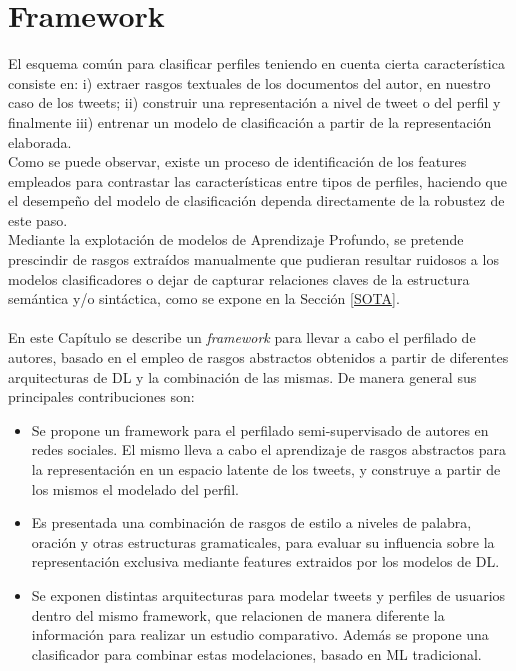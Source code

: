 
\chapter{Framework}

	El esquema común para clasificar perfiles teniendo en cuenta cierta característica consiste en: i) extraer rasgos textuales de los documentos del autor, en nuestro caso de los tweets; ii) construir una representación a nivel de tweet o del perfil y finalmente iii) entrenar un modelo de clasificación a partir de la representación elaborada. 
	\\
	Como se puede observar, existe un proceso de identificación de los features empleados para contrastar las características entre tipos de perfiles, haciendo que el desempeño del modelo de clasificación dependa directamente de la robustez de este paso. 
	\\
	Mediante la explotación de modelos de Aprendizaje Profundo, se pretende prescindir de rasgos extraídos manualmente que pudieran resultar ruidosos a los modelos clasificadores o dejar de capturar relaciones claves de la estructura semántica y/o sintáctica, como se expone en la Sección \ref{SOTA}.
	\\\\
	En este Capítulo se describe un \textit{framework} para llevar a cabo el perfilado de autores, basado en el empleo de rasgos abstractos obtenidos a partir de diferentes arquitecturas de DL y la combinación de las mismas.
	De manera general sus principales contribuciones son:

	\begin{itemize}
			\item Se propone un framework para el perfilado semi-supervisado de autores en redes sociales. El mismo lleva a cabo el aprendizaje de rasgos abstractos para la representación en un espacio latente de los tweets, y construye a partir de los mismos el modelado del perfil.
			
			\item Es presentada una combinación de rasgos de estilo a niveles de palabra, oración y otras estructuras gramaticales, para evaluar su influencia sobre la representación exclusiva mediante features extraidos por los modelos de DL. 
		
			\item  Se exponen distintas arquitecturas para modelar tweets y perfiles de usuarios dentro del mismo framework, que relacionen de manera diferente la información para realizar un estudio comparativo. Además se propone una clasificador para combinar estas modelaciones, basado en ML tradicional.	
	\end{itemize}

